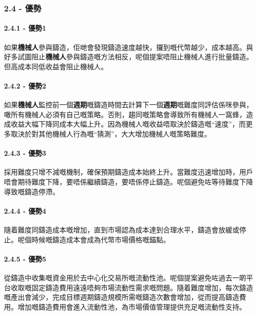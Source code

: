 \documentclass[
]{article}
\begin{document}
\subsubsection{2.4 - 優勢}\label{ux512aux52e2}

\paragraph{2.4.1 - 優勢1}\label{ux512aux52e21}

如果\textbf{機械人}參與鑄造，佢哋會發現鑄造速度越快，攞到嘅代幣越少，成本越高。與好多試圖阻止\textbf{機械人}參與鑄造嘅方法相反，呢個提案唔阻止機械人進行批量鑄造。但高成本同低收益會阻止機械人。

\paragraph{2.4.2 - 優勢2}\label{ux512aux52e22}

如果\textbf{機械人}監控前一個\textbf{週期}嘅鑄造時間去計算下一個\textbf{週期}嘅難度同評估係咪參與，噉所有機械人必須有自己嘅策略。否則，趨同嘅策略會導致所有機械人一窩蜂，造成收益大幅下降同成本大幅上升。因為機械人嘅收益唔取決於鑄造嘅``速度''，而更多取決於對其他機械人行為嘅``猜測''，大大增加機械人嘅策略難度。

\paragraph{2.4.3 - 優勢3}\label{ux512aux52e23}

採用難度只增不減嘅機制，確保預期鑄造成本始終上升。當難度迅速增加時，用戶唔會期待難度下降，要唔係繼續鑄造，要唔係停止鑄造。呢個避免咗等待難度下降導致嘅鑄造停滯。

\paragraph{2.4.4 - 優勢4}\label{ux512aux52e24}

隨着難度同鑄造成本嘅增加，直到市場認為成本達到合理水平，鑄造會放緩或停止。呢個時候嘅鑄造成本會成為代幣市場價格嘅錨點。

\paragraph{2.4.5 - 優勢5}\label{ux512aux52e25}

從鑄造中收集嘅資金用於去中心化交易所嘅流動性池。呢個提案避免咗過去一啲平台收取嘅固定鑄造費用遠遠唔夠市場流動性需求嘅問題。隨着難度增加，每次鑄造嘅產出會減少，完成目標週期鑄造規模所需嘅鑄造次數會增加，從而提高鑄造費用。增加嘅鑄造費用會進入流動性池，為市場價值管理提供充足嘅流動性支持。
\end{document}
